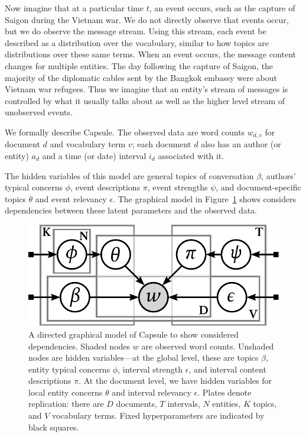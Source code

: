 Now imagine that at a particular time $t$, an event occurs, such as the capture of Saigon during the Vietnam war.  We do not directly observe that events occur, but we do observe the message stream.  Using this stream, each event be described as a distribution over the vocabulary, similar to how topics are distributions over these same terms.  When an event occurs, the message content changes for multiple entities. The day following the capture of Saigon, the majority of the diplomatic cables sent by the Bangkok embassy were about Vietnam war refugees.
Thus we imagine that an entity's stream of messages is controlled by what it usually talks about as well as the higher level stream of unobserved events.

We formally describe Capsule. The observed data are word counts $w_{d,v}$ for document $d$ and vocabulary term $v$; each document $d$ also has an author (or entity) $a_d$ and a time (or date) interval $i_d$ associated with it.

The hidden variables of this model are general topics of conversation $\beta$, authors' typical concerns $\phi$, event descriptions $\pi$, event strengths $\psi$, and document-specific topics $\theta$ and event relevancy $\epsilon$.  The graphical model in Figure~\ref{fig:graphicalmodel} shows considers dependencies between these latent parameters and the observed data.

\begin{figure}[htb]
\centering
\includegraphics[width=\linewidth]{fig/graphicalmodel.pdf}
\caption{A directed graphical model of Capsule to show considered dependencies. Shaded nodes $w$ are observed word counts.  Unshaded nodes are hidden variables---at the global level, these are topics $\beta$, entity typical concerns $\phi$, interval strength $\epsilon$, and interval content descriptions $\pi$.  At the document level, we have hidden variables for local entity concerns $\theta$ and interval relevancy $\epsilon$. Plates denote replication: there are $D$ documents, $T$ intervals, $N$ entities, $K$ topics, and $V$ vocabulary terms. Fixed hyperparameters are indicated by black squares.}
\label{fig:graphicalmodel}
\end{figure}


